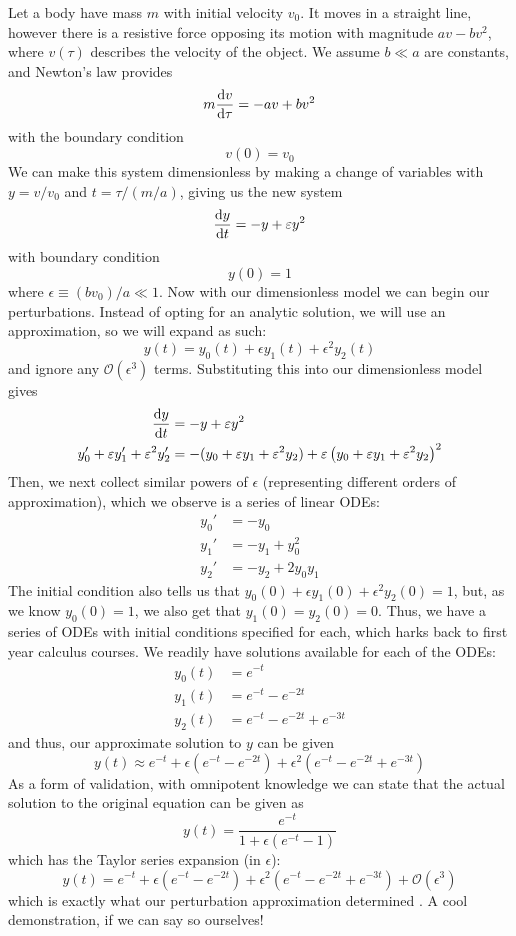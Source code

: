 Let a body have mass $m$ with initial velocity $v_0$. It moves in a straight line, however there is a resistive force opposing its motion 
with magnitude $av - bv^2$, where $v(\tau)$ describes the velocity of the object. We assume $b \ll a$ are constants, and Newton's law provides
$$m \dv{v}{\tau} = -av + bv^2$$
with the boundary condition
$$v(0) = v_0$$
We can make this system dimensionless by making a change of variables with $y = v / v_0$ and $t = \tau / (m / a)$, giving us the new system
$$\dv{y}{t} = -y + \varepsilon y^2$$
with boundary condition
$$y(0) = 1$$
where $\epsilon \equiv (b v_0) / a \ll 1$. Now with our dimensionless model we can begin our perturbations. 
Instead of opting for an analytic solution, 
we will use an approximation, so we will expand as such:
$$y(t) = y_0(t) + \epsilon y_1(t) + \epsilon^2 y_2(t)$$
and ignore any $\mathcal{O}(\epsilon^3)$ terms. Substituting this into our dimensionless model gives
\begin{align*}
    \dv{y}{t} &= -y + \varepsilon y^2 \\
    y_0' + \varepsilon y_1' + \varepsilon^2 y_2' &= -(y_0 + \varepsilon y_1 + \varepsilon^2 y_2) + \varepsilon \left (y_0 + \varepsilon y_1 + \varepsilon^2 y_2 \right )^2
\end{align*}
Then, we next collect similar powers of $\epsilon$ (representing different orders of approximation), which we observe is a series of 
linear ODEs:
\begin{align*}
    y_0' &= -y_0 \\
    y_1' &= -y_1 + y_0^2 \\
    y_2' &= -y_2 + 2y_0 y_1
\end{align*}
The initial condition also tells us that $y_0 (0) + \epsilon y_1(0) + \epsilon^2 y_2(0) = 1$, but, as we know $y_0(0) = 1$, 
we also get that $y_1(0) = y_2(0) = 0$. Thus, we have a series of ODEs with initial conditions specified for each, which 
harks back to first year calculus courses. We readily have solutions available for each of the ODEs:
\begin{align*}
    y_0(t) &= e^{-t} \\
    y_1(t) &= e^{-t} - e^{-2t} \\
    y_2(t) &= e^{-t} - e^{-2t} + e^{-3t}
\end{align*}
and thus, our approximate solution to $y$ can be given
$$y(t) \approx e^{-t} + \epsilon(e^{-t} - e^{-2t}) + \epsilon^2 (e^{-t} - e^{-2t} + e^{-3t})$$
As a form of validation, with omnipotent knowledge we can state that the actual solution to the original equation can 
be given as 
$$y(t) = \frac{e^{-t}}{1 + \epsilon(e^{-t} - 1)}$$
which has the Taylor series expansion (in $\epsilon$):
$$y(t) = e^{-t} + \epsilon(e^{-t} - e^{-2t}) + \epsilon^2(e^{-t} - e^{-2t} + e^{-3t}) + \mathcal{O}(\epsilon^3)$$
which is exactly what our perturbation approximation determined \cite{perturbation-example}. A cool demonstration, if we can say so ourselves!

